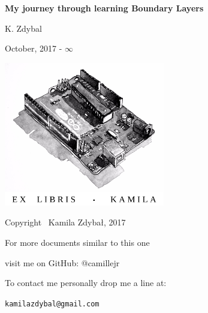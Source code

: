 \documentclass[12pt]{report}
\begin{document}
\begin{titlepage}
    \begin{center}

		\vspace*{6cm}
        \LARGE     
		
        \Huge
        \textbf{My journey through learning Boundary Layers}
        
        \vspace*{1cm}
        


        \vspace{2cm}
        
        \LARGE
        K. Zdybal

        \vspace{6cm}
		\Large

		\vspace{1cm}

 		October, 2017 - $\infty$
	\end{center}
\end{titlepage}



\thispagestyle{empty}
\begin{center}
    
\vspace*{4cm}

\includegraphics[width = 70mm]{arduino_dwg.jpg}

\vspace*{2cm}

Copyright \textcopyright \, Kamila Zdybał, 2017

For more documents similar to this one 

visit me on GitHub: @camillejr

To contact me personally drop me a line at:

\verb|kamilazdybal@gmail.com|

\end{center}
\newpage
\end{document}
